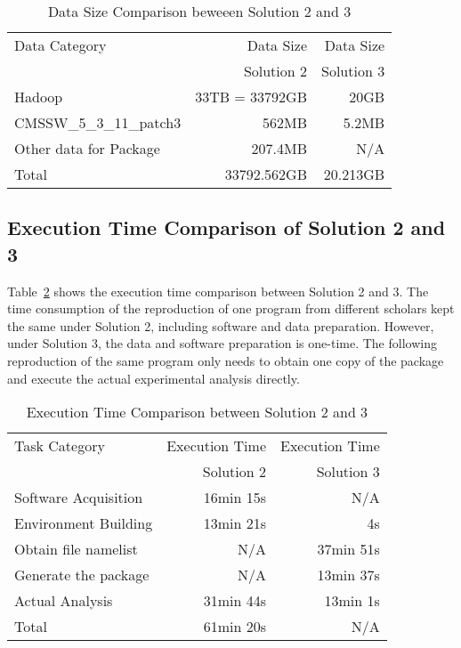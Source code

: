 \documentclass{acm_proc_article-sp}
\begin{document}
\begin{table}
    \centering
    \begin{tabular}{|l|r|r|}
    \hline
     Data Category & Data Size & Data Size \\
    & Solution 2 & Solution 3\\ \hline
    Hadoop & 33TB = 33792GB & 20GB \\ \hline
     CMSSW\_5\_3\_11\_patch3 & 562MB & 5.2MB \\ \hline
     Other data for Package & 207.4MB & N/A \\ \hline
     Total & 33792.562GB & 20.213GB \\ \hline
    \end{tabular}
    \caption{Data Size Comparison beweeen Solution 2 and 3}
    \label{table:datasize-2nd3rd}
\end{table}

\subsection{Execution Time Comparison of Solution 2 and 3}
Table~\ref{table:time-2nd3rd} shows the execution time comparison between Solution 2 and 3. The time consumption of the reproduction of one program from different scholars kept the same under Solution 2, including software and data preparation. However, under Solution 3, the data and software preparation is one-time. The following reproduction of the same program only needs to obtain one copy of the package and execute the actual experimental analysis directly.

\begin{table}
    \centering
    \begin{tabular}{|l|r|r|}
    \hline
    Task Category & Execution Time & Execution Time \\
    & Solution 2 & Solution 3\\ \hline
    Software Acquisition & 16min 15s & N/A \\ \hline
    Environment Building & 13min 21s  & 4s \\ \hline
    Obtain file namelist & N/A & 37min 51s \\ \hline
    Generate the package & N/A & 13min 37s \\ \hline
    Actual Analysis & 31min 44s & 13min 1s \\ \hline
    Total & 61min 20s & N/A \\ \hline
    \end{tabular}
    \caption{Execution Time Comparison between Solution 2 and 3}
    \label{table:time-2nd3rd}
\end{table}    
\end{document}
